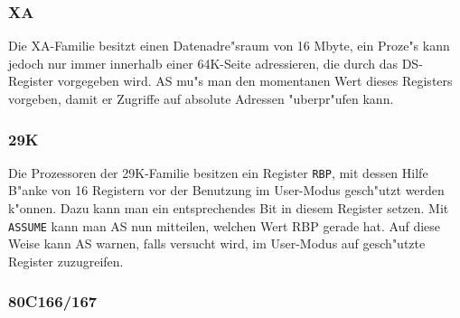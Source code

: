 \documentclass[12pt,a4paper,twoside]{report}
\newcommand{\tty}[1]{{\tt #1}}
\begin{document}
\subsubsection{XA}

Die XA-Familie besitzt einen Datenadre"sraum von 16 Mbyte, ein Proze"s
kann jedoch nur immer innerhalb einer 64K-Seite adressieren, die
durch das DS-Register vorgegeben wird.  AS mu"s man den momentanen
Wert dieses Registers vorgeben, damit er Zugriffe auf absolute
Adressen "uberpr"ufen kann.


\subsubsection{29K}

Die Prozessoren der 29K-Familie besitzen ein Register \tty{RBP}, mit dessen
Hilfe B"anke von 16 Registern vor der Benutzung im User-Modus gesch"utzt
werden k"onnen.  Dazu kann man ein entsprechendes Bit in diesem Register
setzen.  Mit \tty{ASSUME} kann man AS nun mitteilen, welchen Wert RBP
gerade hat.  Auf diese Weise kann AS warnen, falls versucht wird, im
User-Modus auf gesch"utzte Register zuzugreifen.


\subsubsection{80C166/167}
\end{document}
